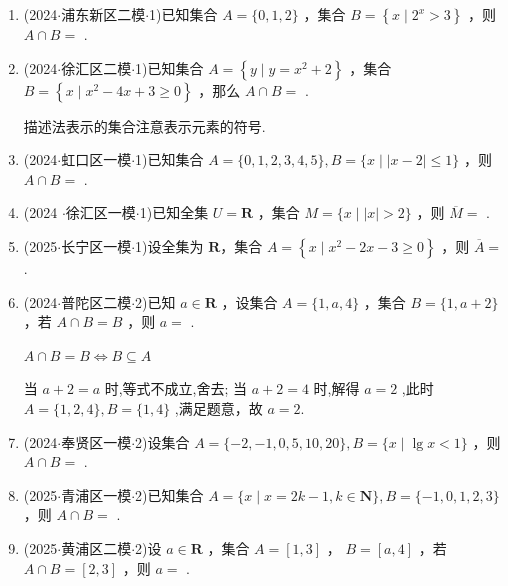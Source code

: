 \begin{enumerate}
    \item (2024$\cdot$浦东新区二模$\cdot$1)已知集合 $A = \{ 0,1,2\}$ ，集合 $B = \left\{  {x \mid  {2}^{x} > 3}\right\}$ ，则 $A \cap  B =$ .

    \item (2024$\cdot$徐汇区二模$\cdot$1)已知集合 $A = \left\{  {y \mid  y = {x}^{2} + 2}\right\}$ ，集合 $B = \left\{  {x \mid  {x}^{2} - {4x} + 3 \geq  0}\right\}$ ，那么 $A \cap  B =$ .
    \begin{jieda}
        描述法表示的集合注意表示元素的符号.
    \end{jieda}

    \item (2024$\cdot$虹口区一模$\cdot$1)已知集合 $A = \{ 0,1,2,3,4,5\} ,B = \{ x \mid  \left| {x - 2}\right|  \leq  1\}$ ，则 $A \cap  B =$ .

    \item (2024 $\cdot$徐汇区一模$\cdot$1)已知全集 $U = \mathbf{R}$ ，集合 $M = \{ x \mid  \left| x\right|  > 2\}$ ，则 $\overline{M} =$ .

    \item (2025$\cdot$长宁区一模$\cdot$1)设全集为 $\mathbf{R}$，集合 $A = \left\{  {x \mid  {x}^{2} - {2x} - 3 \geq  0}\right\}$ ，则 $\overline{A} =$ .

    \item (2024$\cdot$普陀区二模$\cdot$2)已知 $a \in  \mathbf{R}$ ，设集合 $A = \{ 1,a,4\}$ ，集合 $B = \{ 1,a + 2\}$ ，若 $A \cap  B = B$ ，则 $a =$ .
    \begin{jieda}
        $A \cap  B = B \Longleftrightarrow B \subseteq A$
        
        当 $a + 2 = a$ 时,等式不成立,舍去; 当 $a +  2 = 4$ 时,解得 $a = 2$ ,此时 $A = \{ 1,2,4\} ,B = \{ 1,4\}$ ,满足题意，故 $a = 2$.
    \end{jieda}

    \item (2024$\cdot$奉贤区一模$\cdot$2)设集合 $A = \{  - 2, - 1,0,5,{10},{20}\} ,B = \{ x \mid  \lg x < 1\}$ ，则 $A \cap  B =$ .

    \item (2025$\cdot$青浦区一模$\cdot$2)已知集合 $A = \{ x \mid  x = {{2k} - 1},k \in  \mathbf{N}\} ,B = \{  - 1,0,1,2,3\}$ ，则 $A \cap  B =$ .

    \item (2025$\cdot$黄浦区二模$\cdot$2)设 $a \in  \mathbf{R}$ ，集合 $A = \left\lbrack  {1,3}\right\rbrack$ ， $B = \left\lbrack  {a,4}\right\rbrack$ ，若 $A \cap  B = \left\lbrack  {2,3}\right\rbrack$ ，则 $a =$ .


\end{enumerate}
